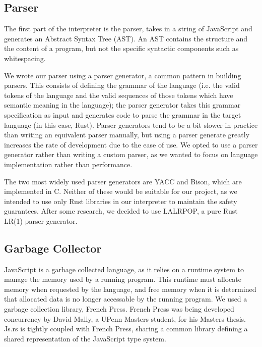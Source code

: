 \documentclass{article}
\begin{document}
\begin{multicols}{2}
\subsection{Parser}

The first part of the interpreter is the parser,
takes in a string of JavaScript and generates an Abstract Syntax Tree (AST).
An AST contains the structure and the content of a program, but not the specific
syntactic components such as whitespacing. \newline

We wrote our parser using a parser generator, a common pattern in building
parsers. This consists of defining the grammar of the language (i.e. the valid
tokens of the language and the valid sequences of those tokens which have
semantic meaning in the language); the parser generator takes this grammar
specification as input and generates code to parse the grammar in the target
language (in this case, Rust). Parser generators tend to be a bit slower in
practice than writing an equivalent parser manually, but using a parser generate
greatly increases the rate of development due to the ease of use. We opted to
use a parser generator rather than writing a custom parser, as we wanted to
focus on language implementation rather than performance. \newline

The two most widely used parser generators are YACC and Bison, which are
implemented in C. Neither of these would be suitable for our project, as we
intended to use only Rust libraries in our interpreter to maintain the safety
guarantees. After some research, we decided to use LALRPOP, a pure Rust LR(1)
parser generator\cite{lalrpop}.

\subsection{Garbage Collector}

JavaScript is a garbage collected language, as it relies on a runtime system to
manage the memory used by a running program. This runtime must allocate memory
when requested by the language, and free memory when it is determined that
allocated data is no longer accessable by the running program. We used a garbage
collection library, French Press. French Press was being developed concurrency
by David Mally, a UPenn Masters student, for his Masters thesis. Js.rs is
tightly coupled with French Press, sharing a common library defining a shared
representation of the JavaScript type system.


\end{multicols}
\end{document}
